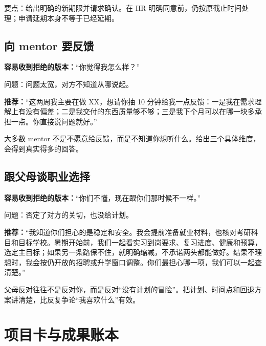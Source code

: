 \documentclass[UTF8,zihao=5,openany]{ctexbook}
\newcommand{\fillrule}{\leavevmode\leaders\hbox{\rule[-0.15em]{2pt}{0.4pt}}\hfill\kern0pt}
\begin{document}
要点：给出明确的新期限并请求确认。在 HR 明确同意前，仍按原截止时间处理；申请延期本身不等于已经延期。

\section{向 mentor 要反馈}
\begin{casebox}
\textbf{容易收到拒绝的版本：}“你觉得我怎么样？”
\end{casebox}

问题：问题太宽，对方不知道从哪说起。

\begin{casebox}
\textbf{推荐：}“这两周我主要在做 XX，想请你抽 10 分钟给我一点反馈：一是我在需求理解上有没有偏差；二是我交付的东西质量够不够；三是我下个月可以在哪一块多承担一点。你直接说问题就好。”
\end{casebox}

大多数 mentor 不是不愿意给反馈，而是不知道你想听什么。给出三个具体维度，会得到真实得多的回答。

\section{跟父母谈职业选择}
\begin{casebox}
\textbf{容易收到拒绝的版本：}“你们不懂，现在跟你们那时候不一样。”
\end{casebox}

问题：否定了对方的关切，也没给计划。

\begin{casebox}
\textbf{推荐：}“我知道你们担心的是稳定和安全。我会提前准备就业材料，也核对考研科目和目标学校。暑期开始前，我们一起看实习到岗要求、复习进度、健康和预算，选定主目标；如果另一条路保不住，就明确缩减，不承诺两头都能做好。结果不理想时，我会按仍开放的招聘或升学窗口调整。你们最担心哪一项，我们可以一起查清楚。”
\end{casebox}

父母反对往往不是反对你，而是反对“没有计划的冒险”。把计划、时间点和回退方案讲清楚，比反复争论“我喜欢什么”有效。


\chapter{项目卡与成果账本}
\end{document}
